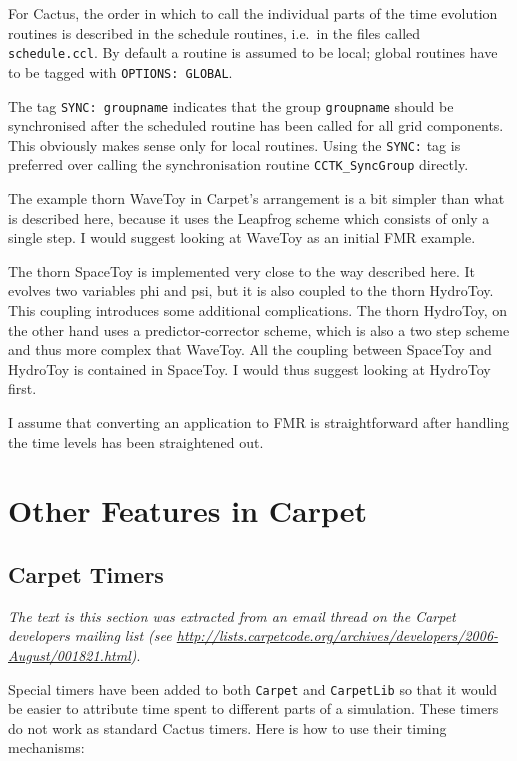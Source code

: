 For Cactus, the order in which to call the individual parts of the
time evolution routines is described in the schedule routines, i.e.\
in the files called \texttt{schedule.ccl}.  By default a routine is
assumed to be local; global routines have to be tagged with
\texttt{OPTIONS: GLOBAL}.

The tag \texttt{SYNC: groupname} indicates that the group
\texttt{groupname} should be synchronised after the scheduled routine
has been called for all grid components.  This obviously makes sense
only for local routines.  Using the \texttt{SYNC:} tag is preferred
over calling the synchronisation routine \texttt{CCTK\_SyncGroup}
directly.

The example thorn WaveToy in Carpet's arrangement is a bit simpler
than what is described here, because it uses the Leapfrog scheme which
consists of only a single step.  I would suggest looking at WaveToy as
an initial FMR example.

The thorn SpaceToy is implemented very close to the way described
here.  It evolves two variables phi and psi, but it is also coupled to
the thorn HydroToy.  This coupling introduces some additional
complications.  The thorn HydroToy, on the other hand uses a
predictor-corrector scheme, which is also a two step scheme and thus
more complex that WaveToy.  All the coupling between SpaceToy and
HydroToy is contained in SpaceToy.  I would thus suggest looking at
HydroToy first.

I assume that converting an application to FMR is straightforward
after handling the time levels has been straightened out.



\section{Other Features in Carpet}

\subsection{Carpet Timers}

{\it The text is this section was extracted from an email thread on the
Carpet developers mailing list (see \url{http://lists.carpetcode.org/archives/developers/2006-August/001821.html})}.

Special timers have been added to both {\tt Carpet} and {\tt CarpetLib} so
that it would be easier to attribute time spent to different parts of
a simulation.  These timers do not work as standard Cactus timers.
Here is how to use their timing mechanisms:

